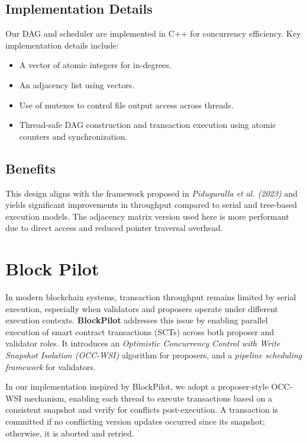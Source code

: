 \documentclass[12pt]{article}
\begin{document}
\subsection{Implementation Details}

Our DAG and scheduler are implemented in C++ for concurrency efficiency. Key implementation details include:
\begin{itemize}
    \item A vector of atomic integers for in-degrees.
    \item An adjacency list using vectors.
    \item Use of mutexes to control file output access across threads.
    \item Thread-safe DAG construction and transaction execution using atomic counters and synchronization.
\end{itemize}

\subsection{Benefits}

This design aligns with the framework proposed in \textit{Piduguralla et al. (2023)} and yields significant improvements in throughput compared to serial and tree-based execution models. The adjacency matrix version used here is more performant due to direct access and reduced pointer traversal overhead.





\section{Block Pilot}

In modern blockchain systems, transaction throughput remains limited by serial execution, especially when validators and proposers operate under different execution contexts. \textbf{BlockPilot} addresses this issue by enabling parallel execution of smart contract transactions (SCTs) across both proposer and validator roles. It introduces an \textit{Optimistic Concurrency Control with Write Snapshot Isolation (OCC-WSI)} algorithm for proposers, and a \textit{pipeline scheduling framework} for validators.

In our implementation inspired by BlockPilot, we adopt a proposer-style OCC-WSI mechanism, enabling each thread to execute transactions based on a consistent snapshot and verify for conflicts post-execution. A transaction is committed if no conflicting version updates occurred since its snapshot; otherwise, it is aborted and retried.
\end{document}
